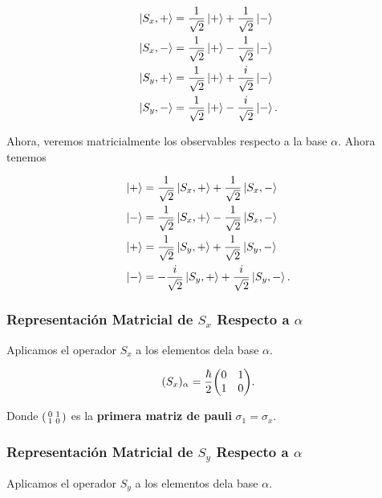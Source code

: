 \begin{tcolorbox}
	\begin{align}
		\ket{S_{x} ,+} &= \frac{1}{\sqrt{2}} \ket{+} + \frac{1}{\sqrt{2}} \ket{-} \\
		\ket{S_{x} ,-} &= \frac{1}{\sqrt{2}} \ket{+} - \frac{1}{\sqrt{2}} \ket{-} \\
		\ket{S_{y} ,+} &= \frac{1}{\sqrt{2}} \ket{+} + \frac{i}{\sqrt{2}} \ket{-} \\
		\ket{S_{y} ,-} &= \frac{1}{\sqrt{2}} \ket{+} - \frac{i}{\sqrt{2}} \ket{-} .
	\end{align}
\end{tcolorbox}

Ahora, veremos matricialmente los observables respecto a la base $\alpha$. Ahora tenemos

\begin{tcolorbox}
	\begin{align}
		\ket{+} &= \frac{1}{\sqrt{2}} \ket{S_{x} ,+} + \frac{1}{\sqrt{2}} \ket{S_{x} ,-} \\
		\ket{-} &= \frac{1}{\sqrt{2}} \ket{S_{x} ,+} - \frac{1}{\sqrt{2}} \ket{S_{x} ,-} \\
		\ket{+} &= \frac{1}{\sqrt{2}} \ket{S_{y} ,+} + \frac{1}{\sqrt{2}} \ket{S_{y} ,-} \\
		\ket{-} &= -\frac{i}{\sqrt{2}} \ket{S_{y} ,+} + \frac{i}{\sqrt{2}} \ket{S_{y} ,-} .
	\end{align}
\end{tcolorbox}


\subsubsection{Representación Matricial de $S_x$ Respecto a $\alpha$}

Aplicamos el operador $S_x$ a los elementos dela base $\alpha$.

\begin{equation}
	(S_x)_\alpha = \frac{\hbar}{2} \mqty(0 & 1 \\ 1 & 0).
\end{equation}


Donde $\smqty(\pmat{1})$ es la \textbf{primera matriz de pauli} $\sigma _1 = \sigma _x$.






\subsubsection{Representación Matricial de $S_y$ Respecto a $\alpha$}

Aplicamos el operador $S_y$ a los elementos dela base $\alpha$.


